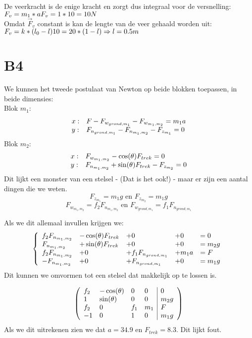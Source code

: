 \documentclass[10pt,a4paper]{article}
\begin{document}
\noindent De veerkracht is de enige kracht en zorgt dus integraal voor de versnelling:\\
$F_v = m_1*a\\
F_v = 1*10 = 10 N$\\

\noindent Omdat $\vec{F}_v$ constant is kan de lengte van de veer gehaald worden uit:\\
$F_v = k * (l_0 - l)\\
10 = 20 *(1 -l)\\
\Rightarrow l =0.5m$
\section*{B4}
We kunnen het tweede postulaat van Newton op beide blokken toepassen, in beide dimensies:\\
Blok $m_1$:
\[
\begin{array}{l l}
x: & F- F_{w_{grond,m_1}} -F_{w_{m_1,m_2}}=m_1a\\
y: & F_{n_{grond,m_1}}-F_{n_{m_1,m_2}}-F_{z_{m_1}}=0\\
\end{array}
\]
Blok $m_2$:
\[
\begin{array}{l l}
x: & F_{w_{m_1,m_2}} - \cos(\theta)F_{trek} = 0\\
y: & F_{n_{m_1,m_2}} + \sin(\theta)F_{trek} - F_{z_{m_2}}=0\\
\end{array}
\]
Dit lijkt een monster van een stelsel - (Dat is het ook!) - maar er zijn een aantal dingen die we weten.
\[
F_{z_{m_1}} = m_1g \text{ en } F_{z_{m_2}} = m_1g
\]
\[
F_{w_{m_1,m_2}} = f_2F_{n_{m_1,m_2}} \text{ en } F_{w_{grond,m_1}} = f_1F_{n_{grond,m_1}}
\]

Als we dit allemaal invullen krijgen we:
\[
\left\lbrace
\begin{array}{l l l l l}

f_2F_{n_{m_1,m_2}} &- \cos(\theta)F_{trek} &+ 0 &+ 0 &= 0\\
F_{n_{m_1,m_2}} &+ \sin(\theta)F_{trek} &+ 0 &+ 0 &= m_2g\\
 f_2F_{n_{m_1,m_2}} &+ 0 &+ f_1F_{n_{grond,m_1}} &+ m_1a &= F\\
-F_{n_{m_1,m_2}} &+ 0 &+F_{n_{grond,m_1}} &+ 0 &= m_1g\\
\end{array}
\right.
\]
Dit kunnen we omvormen tot een stelsel dat makkelijk op te lossen is.

\[
\left(
\begin{array}{l l l l | l}
f_2 & -\cos(\theta) & 0 & 0 & 0\\
1 &  \sin(\theta) & 0 & 0 & m_2g\\
f_2 & 0 & f_1 & m_1 & F\\
-1 & 0 & 1 & 0 & m_1g
\end{array}
\right)
\]
Als we dit uitrekenen zien we dat $a = 34.9$ en $F_{trek} = 8.3$. Dit lijkt fout.
\end{document}
